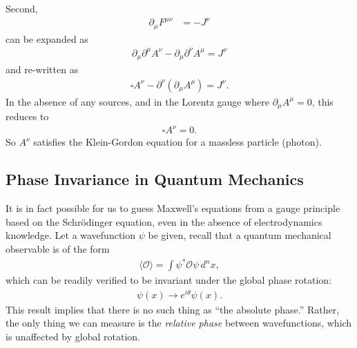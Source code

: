 \documentclass[a4paper,11pt]{article}
\numberwithin{equation}{section}
\theoremstyle{definition}
\newcommand{\p}{\partial}
\begin{document}
Second, 
\begin{align*}
\p_\mu F^{\mu\nu} &= -J^\nu
\end{align*}
can be expanded as
\begin{align*}
\p_\mu \p^\mu A^\nu - \p_\mu \p^\nu A^\mu = J^\nu
\end{align*}
and re-written as
\begin{align*}
\square A^\nu - \p^\nu(\p_\mu A^\mu) = J^\nu.
\end{align*}
In the absence of any sources, and in the Lorentz gauge where $\p_\mu A^\mu = 0$, this reduces to
\begin{align*}
\square A^\nu = 0.
\end{align*}
So $A^\nu$ satisfies the Klein-Gordon equation for a massless particle (photon). 


\subsection{Phase Invariance in Quantum Mechanics}
It is in fact possible for us to guess Maxwell's equations from a gauge principle based on the Schr\"odinger equation, even in the absence of electrodynamics knowledge. Let a wavefunction $\psi$ be given, recall that a quantum mechanical observable is of the form
\begin{align*}
\langle \mathcal{O} \rangle = \int\psi^* \mathcal{O} \psi\, d^nx,
\end{align*}
which can be readily verified to be invariant under the global phase rotation:
\begin{align*}
\psi(x) \to e^{i\theta}\psi(x).
\end{align*}
This result implies that there is no such thing as ``the absolute phase.'' Rather, the only thing we can measure is the \textit{relative phase} between wavefunctions, which is unaffected by global rotation.\\
\end{document}
